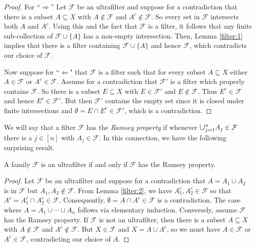 \begin{proof}
For ``$\Rightarrow$'' Let \( \mathcal{F}  \) be an ultrafilter and suppose for a contradiction that there is a subset \( A \subseteq X \) with \( A \notin \mathcal{F}  \) and \( A^{c} \notin \mathcal{F}  \). So every set in \( \mathcal{F}  \) intersects both \( A \) and \( A^{c}  \). Using this and the fact that \( \mathcal{F}  \) is a filter, it follows that any finite sub-collection of \( \mathcal{F} \cup \{ A \}  \) has a non-empty intersection. Then, Lemma \ref{filter:1} implies that there is a filter containing \( \mathcal{F} \cup \{ A \}  \) and hence \( \mathcal{F}  \), which contradicts our choice of \( \mathcal{F}  \).

Now suppose for ``$\Leftarrow$" that \( \mathcal{F}  \) is a filter such that for every subset \( A \subseteq X \) either \( A \in \mathcal{F}  \) or \( A^{c} \in \mathcal{F}  \). Assume for a contradiction that \( \mathcal{F}' \) is a filter which properly contains \( \mathcal{F}  \). So there is a subset \( E \subseteq X \) with \( E \in \mathcal{F} ' \) and \( E \notin \mathcal{F}  \). Thus \( E^{c} \in \mathcal{F}  \) and hence \( E^{c} \in \mathcal{F} ' \). But then \( \mathcal{F} ' \) contains the empty set since it is closed under finite intersections and \( \emptyset = E \cap E^{c} \in \mathcal{F} ' \), which is a contradiction.
\end{proof}
We will say that a filter \( \mathcal{F}  \) has the \emph{Ramsey property} if whenever \( \medcup_{j=1}^{n} A_{j}  \in \mathcal{F}  \) there is a \( j \in [n] \) with \( A_{j} \in \mathcal{F}  \). In this connection, we have the following surprising result.
\begin{lemma}
\label{filter:3}
A family \( \mathcal{F}  \) is an ultrafilter if and only if \( \mathcal{F}  \) has the Ramsey property.
\end{lemma}
\begin{proof}
	Let \( \mathcal{F}  \) be an ultrafilter and suppose for a contradiction that \( A = A_1 \cup A_2 \) is in \( \mathcal{F}\) but \( A_1, A_2 \notin \mathcal{F}  \). From Lemma \ref{filter:2}, we have \( A_1^{c} , A_2^{c} \in \mathcal{F}  \) so that \( A^{c} = A_1^{c} \cap A_2^{c} \in \mathcal{F}  \). Consequently, \( \emptyset = A \cap A^{c} \in \mathcal{F}  \) is a contradiction. The case where \( A = A_1 \cup \cdots \cup A_{n}  \) follows via elementary induction. Conversely, assume \( \mathcal{F}  \) has the Ramsey property. If \( \mathcal{F}  \) is not an ultrafilter, then there is a subset \( A \subseteq X \) with \( A \notin \mathcal{F}  \) and \( A^{c} \notin \mathcal{F}  \). But \(X \in \mathcal{F}  \) and \( X = A \cup A^{c}  \), so we must have \( A \in \mathcal{F}  \) or \( A^{c} \in \mathcal{F}  \), contradicting our choice of \( A \).
\end{proof}
